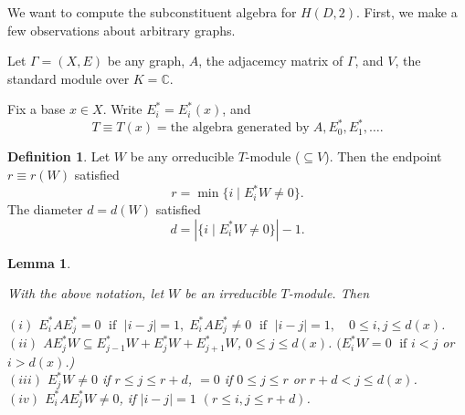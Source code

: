 \documentclass[
]{book}
\newtheorem{lemma}{Lemma}[chapter]
\theoremstyle{definition}
\newtheorem{definition}{Definition}[chapter]
\theoremstyle{definition}
\theoremstyle{definition}
\theoremstyle{definition}
\theoremstyle{remark}
\begin{document}
We want to compute the subconstituent algebra for \(H(D,2)\). First, we make a few observations about arbitrary graphs.

Let \(\Gamma = (X,E)\) be any graph, \(A\), the adjacemcy matrix of \(\Gamma\), and \(V\), the standard module over \(K = \mathbb{C}\).

Fix a base \(x\in X\). Write \(E_i^* = E_i^*(x)\), and
\[T \equiv T(x) = \text{the algebra generated by}\; A, E_0^*, E_1^*, \ldots .\]

\begin{definition}
Let \(W\) be any orreducible \(T\)-module (\(\subseteq V\)). Then the endpoint \(r \equiv r(W)\) satisfied
\[r = \min\{i\mid E_i^*W \neq 0\}.\]
The diameter \(d = d(W)\) satisfied
\[d = |\{i\mid E_i^*W \neq 0\}| - 1.\]
\end{definition}

\begin{lemma}
\protect\hypertarget{lem:irreducible}{}\label{lem:irreducible}

With the above notation, let \(W\) be an irreducible \(T\)-module. Then

\((i)\) \(E_i^*AE_j^* = 0 \; \text{ if }\; |i-j|=1, \; E_i^*AE_j^*\neq 0 \; \text{ if }\; |i-j| = 1, \quad 0\leq i,j\leq d(x)\).\\
\((ii)\) \(AE_j^*W \subseteq E_{j-1}^*W + E_j^*W + E^*_{j+1}W\), \(0\leq j \leq d(x)\). \((E_i^*W = 0 \; \text{ if } i<j\) or \(i > d(x)\).)\\
\((iii)\) \(E^*_jW \neq 0\) if \(r\leq j \leq r+d\), \(=0\) if \(0\leq j\leq r\) or \(r+d < j \leq d(x)\).\\
\((iv)\) \(E_i^*AE^*_jW \neq 0\), if \(|i-j| = 1\) \((r \leq i,j \leq r+d)\).

\end{lemma}
\end{document}
